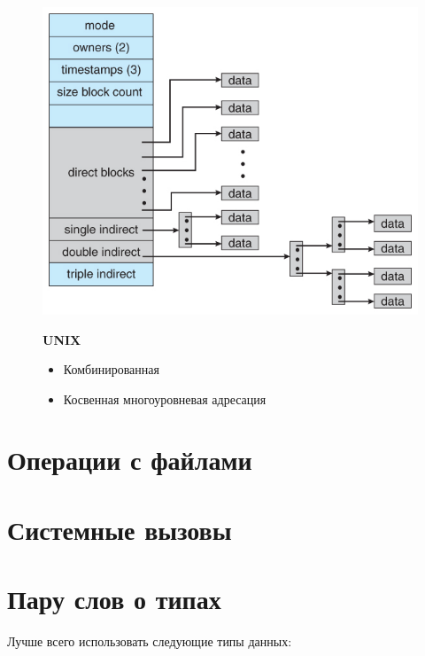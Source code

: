 \documentclass[../../lectures.tex]{subfiles}
\begin{document}
\begin{figure}[H]
\captionsetup{singlelinecheck=off}
\begin{minipage}[c]{0.5\linewidth}
\centering
\includegraphics[width=\textwidth]{images/unix-inode.jpg}
\end{minipage}
\hspace{0.5cm}
\begin{minipage}[c]{0.5\linewidth}
\centering
\textbf{UNIX}
\begin{itemize}
    \item Комбинированная
    \item Косвенная многоуровневая адресация
\end{itemize}
\end{minipage}
\end{figure}

\section{Операции с файлами}

\section{Системные вызовы}
\todo{}

\section{Пару слов о типах}
Лучше всего использовать следующие типы данных:
\end{document}
